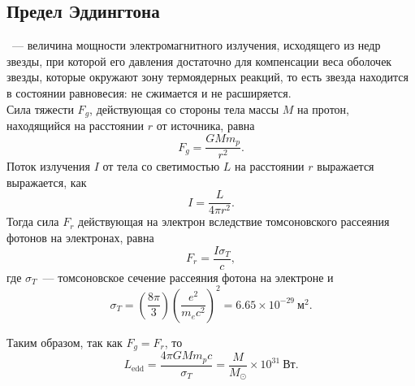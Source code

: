 \subsection{Предел Эддингтона}
~--- величина мощности электромагнитного излучения, исходящего из недр звезды, при которой его давления достаточно для компенсации веса оболочек звезды, которые окружают зону термоядерных реакций, то есть звезда находится в состоянии равновесия: не сжимается и не расширяется.\\
Сила тяжести $F_g$, действующая со стороны тела массы $M$ на протон, находящийся на расстоянии $r$ от источника, равна
\begin{equation}
F_g = \frac{G M m_p}{r^2}.
\end{equation}
Поток излучения $I$  от тела со светимостью $L$ на расстоянии $r$ выражается выражается, как
\begin{equation}
I=\frac{L}{4\pi r^2}.
\end{equation}
Тогда сила $F_r$ действующая на электрон вследствие томсоновского рассеяния фотонов на электронах, равна
\begin{equation}
F_r = \frac{I \sigma_T}{c},
\end{equation}
где $\sigma_T$~--- томсоновское сечение рассеяния фотона на электроне и 
\begin{equation}
\sigma_T = \left(\frac{8\pi}{3}\right)\left(\frac{e^2}{m_e c^2}\right)^2 = 6.65 \times 10^{-29}~\text{м}^2.
\end{equation}

Таким образом, так как $F_g = F_r$, то
\begin{equation}
L_\text{edd} = \frac{4\pi G M m_p c}{\sigma_T} =  \frac{M}{M_\odot} \times 10^{31}~\text{Вт}.
\end{equation}